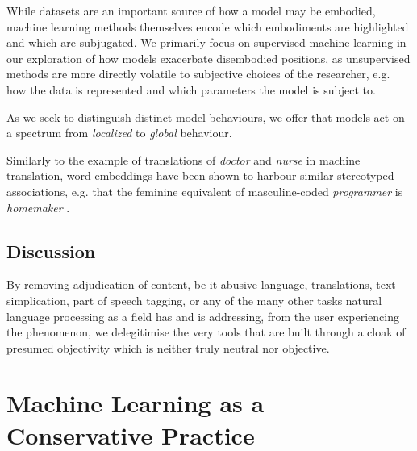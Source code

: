 While datasets are an important source of how a model may be embodied, machine learning methods themselves encode which embodiments are highlighted and which are subjugated. We primarily focus on supervised machine learning in our exploration of how models exacerbate disembodied positions, as unsupervised methods are more directly volatile to subjective choices of the researcher, e.g. how the data is represented and which parameters the model is subject to. 

As we seek to distinguish distinct model behaviours, we offer that models act on a spectrum from \textit{localized} to \textit{global} behaviour.

Similarly to the example of translations of \textit{doctor} and \textit{nurse} in machine translation, word embeddings have been shown to harbour similar stereotyped associations, e.g. that the feminine equivalent of masculine-coded \textit{programmer} is \textit{homemaker} \citet{Bolukbasi:2016}.

\subsection{Discussion}
By removing adjudication of content, be it abusive language, translations, text simplication, part of speech tagging, or any of the many other tasks natural language processing as a field has and is addressing, from the user experiencing the phenomenon, we delegitimise the very tools that are built through a cloak of presumed objectivity which is neither truly neutral nor objective.

\section{Machine Learning as a Conservative Practice}

